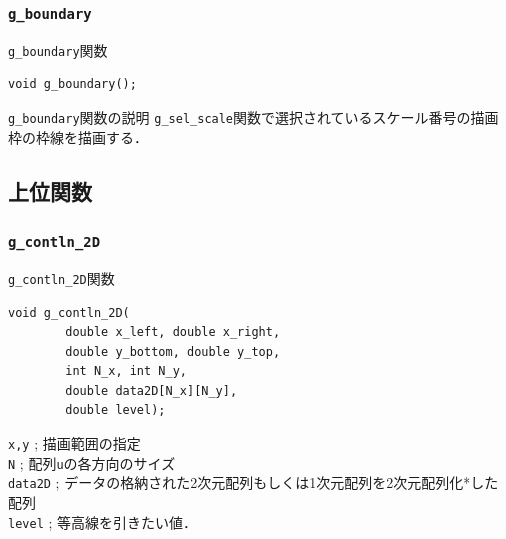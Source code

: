 \documentclass[platex,a4paper,12pt]{jsarticle}%
\begin{document}
\clearpage
\subsubsection{\texttt{g\_boundary}}

\begin{itembox}[l]{\texttt{g\_boundary}関数}
\begin{verbatim}
void g_boundary();
\end{verbatim}
\end{itembox}

\begin{itembox}[l]{\texttt{g\_boundary}関数の説明}
\verb|g_sel_scale|関数で選択されているスケール番号の描画枠の枠線を描画する．
\end{itembox}





\clearpage
\subsection{上位関数}
\subsubsection{\texttt{g\_contln\_2D}}

\begin{itembox}[l]{\texttt{g\_contln\_2D}関数}
\begin{verbatim}
void g_contln_2D(
        double x_left, double x_right,
        double y_bottom, double y_top,
        int N_x, int N_y,
        double data2D[N_x][N_y],
        double level);
\end{verbatim}
\verb|x,y| ; 描画範囲の指定\\
\verb|N| ; 配列\verb|u|の各方向のサイズ\\
\verb|data2D| ; データの格納された2次元配列もしくは1次元配列を2次元配列化*した配列\\
\verb|level| ; 等高線を引きたい値．
\end{itembox}
\end{document}
